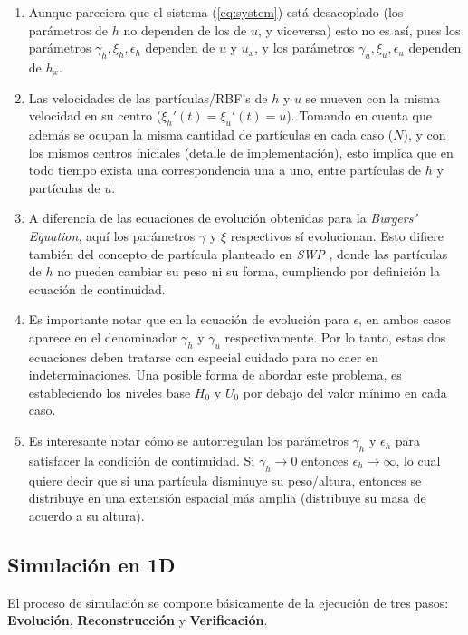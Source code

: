 \documentclass[spanish]{article} %
\providecommand{\DIFaddtex}[1]{{\protect\color{blue} \sf #1}} %
\providecommand{\DIFadd}[1]{\texorpdfstring{\DIFaddtex{#1}}{#1}} %
\begin{document}
    \begin{enumerate}
        \item \DIFadd{Aunque pareciera que el sistema (\ref{eq:system}) está desacoplado (los parámetros de $h$ no dependen de los de $u$, y viceversa) esto no es así, pues los parámetros $\gamma_h, \xi_h, \epsilon_h$ dependen de $u$ y $u_x$, y los parámetros $\gamma_u, \xi_u, \epsilon_u$ dependen de $h_x$.
        }\item \DIFadd{Las velocidades de las partículas/RBF's de $h$ y $u$ se mueven con la misma velocidad en su centro ($\xi_h'(t) = \xi_u'(t) = u$). Tomando en cuenta que además se ocupan la misma cantidad de partículas en cada caso ($N$), y con los mismos centros iniciales (detalle de implementación), esto implica que en todo tiempo exista una correspondencia una a uno, entre partículas de $h$ y partículas de $u$.
        }\item \DIFadd{A diferencia de las ecuaciones de evolución obtenidas para la \textit{Burgers' Equation}, aquí los parámetros $\gamma$ y $\xi$ respectivos sí evolucionan. Esto difiere también del concepto de partícula planteado en \textit{SWP} \cite{swp}, donde las partículas de $h$ no pueden cambiar su peso ni su forma, cumpliendo por definición la ecuación de continuidad.
        }\item \DIFadd{Es importante notar que en la ecuación de evolución para $\epsilon$, en ambos casos aparece en el denominador $\gamma_h$ y $\gamma_u$ respectivamente. Por lo tanto, estas dos ecuaciones deben tratarse con especial cuidado para no caer en indeterminaciones. Una posible forma de abordar este problema, es estableciendo los niveles base $H_0$ y $U_0$ por debajo del valor mínimo en cada caso.
        }\item \DIFadd{Es interesante notar cómo se autorregulan los parámetros $\gamma_h$ y $\epsilon_h$ para satisfacer la condición de continuidad. Si $\gamma_h \rightarrow 0$ entonces $\epsilon_h \rightarrow \infty$, lo cual quiere decir que si una partícula disminuye su peso/altura, entonces se distribuye en una extensión espacial más amplia (distribuye su masa de acuerdo a su altura).  
    }\end{enumerate}

    \subsection{\DIFadd{Simulación en 1D}}

    \DIFadd{El proceso de simulación se compone básicamente de la ejecución de tres pasos: \textbf{Evolución}, \textbf{Reconstrucción} y \textbf{Verificación}.
}
\end{document}
